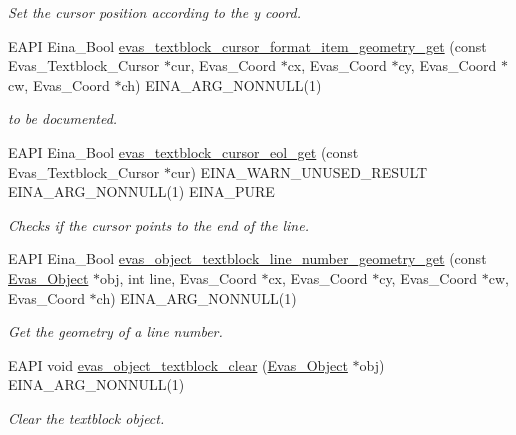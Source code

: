 \begin{DoxyCompactItemize}
\begin{DoxyCompactList}\small\item\em Set the cursor position according to the y coord. \item\end{DoxyCompactList}\item 
EAPI Eina\_\-Bool \hyperlink{group__Evas__Object__Textblock_ga6938413ee2c12497dfa517c3575e0311}{evas\_\-textblock\_\-cursor\_\-format\_\-item\_\-geometry\_\-get} (const Evas\_\-Textblock\_\-Cursor $\ast$cur, Evas\_\-Coord $\ast$cx, Evas\_\-Coord $\ast$cy, Evas\_\-Coord $\ast$cw, Evas\_\-Coord $\ast$ch) EINA\_\-ARG\_\-NONNULL(1)
\begin{DoxyCompactList}\small\item\em to be documented. \item\end{DoxyCompactList}\item 
EAPI Eina\_\-Bool \hyperlink{group__Evas__Object__Textblock_gad5c9c6526512b13fe53aa763778aa6f8}{evas\_\-textblock\_\-cursor\_\-eol\_\-get} (const Evas\_\-Textblock\_\-Cursor $\ast$cur) EINA\_\-WARN\_\-UNUSED\_\-RESULT EINA\_\-ARG\_\-NONNULL(1) EINA\_\-PURE
\begin{DoxyCompactList}\small\item\em Checks if the cursor points to the end of the line. \item\end{DoxyCompactList}\item 
EAPI Eina\_\-Bool \hyperlink{group__Evas__Object__Textblock_ga77d99df8bcb139f2a499a0dda4c5dca1}{evas\_\-object\_\-textblock\_\-line\_\-number\_\-geometry\_\-get} (const \hyperlink{group__Evas__Object__Group_ga9e19e6dd1f517a0ba437c0114d3e7c97}{Evas\_\-Object} $\ast$obj, int line, Evas\_\-Coord $\ast$cx, Evas\_\-Coord $\ast$cy, Evas\_\-Coord $\ast$cw, Evas\_\-Coord $\ast$ch) EINA\_\-ARG\_\-NONNULL(1)
\begin{DoxyCompactList}\small\item\em Get the geometry of a line number. \item\end{DoxyCompactList}\item 
EAPI void \hyperlink{group__Evas__Object__Textblock_gad5ee9184f370f602d2005ea8091a2c29}{evas\_\-object\_\-textblock\_\-clear} (\hyperlink{group__Evas__Object__Group_ga9e19e6dd1f517a0ba437c0114d3e7c97}{Evas\_\-Object} $\ast$obj) EINA\_\-ARG\_\-NONNULL(1)
\begin{DoxyCompactList}\small\item\em Clear the textblock object. \item\end{DoxyCompactList}\item 

\end{DoxyCompactItemize}
